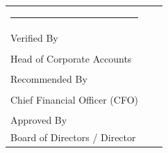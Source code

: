 \documentclass[9pt, a4paper]{article}
\begin{document}
\vspace{1.5cm}

\noindent
\begin{tabularx}{\textwidth}{X X X}
    \centering \rule{4.5cm}{0.4pt} \\ \fontsize{8}{10}\selectfont Verified By \\ Head of Corporate Accounts & 
    \centering \rule{4.5cm}{0.4pt} \\ \fontsize{8}{10}\selectfont Recommended By \\ Chief Financial Officer (CFO) & 
    \centering \rule{4.5cm}{0.4pt} \\ \fontsize{8}{10}\selectfont Approved By \\ Board of Directors / Director
\end{tabularx}
\end{document}
